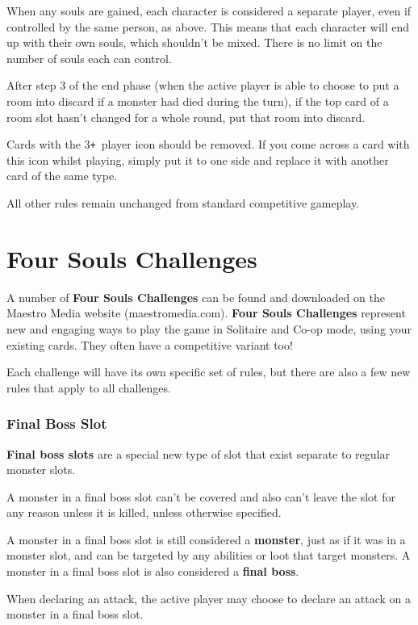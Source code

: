 \documentclass[10pt, a4paper, twoside]{article} %
\def\plus{\texttt{+}}
\begin{document}
    When any souls are gained, each character is considered a separate player, even if controlled by the same person, as above. This means that each character will end up with their own souls, which shouldn’t be mixed. There is no limit on the number of souls each can control.

    After step 3 of the end phase (when the active player is able to choose to put a room into discard if a monster had died during the turn), if the top card of a room slot hasn’t changed for a whole round, put that room into discard.

    Cards with the 3\plus\ player icon should be removed. If you come across a card with this icon whilst playing, simply put it to one side and replace it with another card of the same type.

    All other rules remain unchanged from standard competitive gameplay.

    \section{Four Souls Challenges}
    A number of \textbf{Four Souls Challenges} can be found and downloaded on the Maestro Media website (maestromedia.com). \textbf{Four Souls Challenges} represent new and engaging ways to play the game in Solitaire and Co-op mode, using your existing cards. They often have a competitive variant too!

    Each challenge will have its own specific set of rules, but there are also a few new rules that apply to all challenges.

    \subsubsection*{Final Boss Slot}
    \textbf{Final boss slots} are a special new type of slot that exist separate to regular monster slots.

    A monster in a final boss slot can’t be covered and also can’t leave the slot for any reason unless it is killed, unless otherwise specified.

    A monster in a final boss slot is still considered a \textbf{monster}, just as if it was in a monster slot, and can be targeted by any abilities or loot that target monsters. A monster in a final boss slot is also considered a \textbf{final boss}.

    When declaring an attack, the active player may choose to declare an attack on a monster in a final boss slot.
\end{document}
